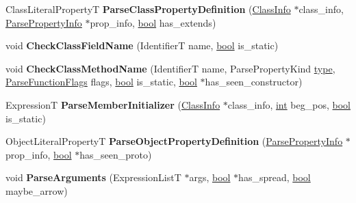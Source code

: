 \begin{DoxyCompactItemize}
\item 
\mbox{\label{classv8_1_1internal_1_1ParserBase_a5e44207ea2015814a7ef9e1edb6fb036}} 
Class\+Literal\+PropertyT {\bfseries Parse\+Class\+Property\+Definition} (\mbox{\hyperlink{structv8_1_1internal_1_1ParserBase_1_1ClassInfo}{Class\+Info}} $\ast$class\+\_\+info, \mbox{\hyperlink{structv8_1_1internal_1_1ParserBase_1_1ParsePropertyInfo}{Parse\+Property\+Info}} $\ast$prop\+\_\+info, \mbox{\hyperlink{classbool}{bool}} has\+\_\+extends)
\item 
\mbox{\label{classv8_1_1internal_1_1ParserBase_aac3022d3d8ac8def11e73bef6c20ce11}} 
void {\bfseries Check\+Class\+Field\+Name} (IdentifierT name, \mbox{\hyperlink{classbool}{bool}} is\+\_\+static)
\item 
\mbox{\label{classv8_1_1internal_1_1ParserBase_a49383d4a031fb45d52a315274fb2510d}} 
void {\bfseries Check\+Class\+Method\+Name} (IdentifierT name, Parse\+Property\+Kind \mbox{\hyperlink{classstd_1_1conditional_1_1type}{type}}, \mbox{\hyperlink{classv8_1_1base_1_1Flags}{Parse\+Function\+Flags}} flags, \mbox{\hyperlink{classbool}{bool}} is\+\_\+static, \mbox{\hyperlink{classbool}{bool}} $\ast$has\+\_\+seen\+\_\+constructor)
\item 
\mbox{\label{classv8_1_1internal_1_1ParserBase_af336fb6bfb4e9ef2c7c941d1c238ae1b}} 
ExpressionT {\bfseries Parse\+Member\+Initializer} (\mbox{\hyperlink{structv8_1_1internal_1_1ParserBase_1_1ClassInfo}{Class\+Info}} $\ast$class\+\_\+info, \mbox{\hyperlink{classint}{int}} beg\+\_\+pos, \mbox{\hyperlink{classbool}{bool}} is\+\_\+static)
\item 
\mbox{\label{classv8_1_1internal_1_1ParserBase_a4deeeae9572429fc183851accc42c1af}} 
Object\+Literal\+PropertyT {\bfseries Parse\+Object\+Property\+Definition} (\mbox{\hyperlink{structv8_1_1internal_1_1ParserBase_1_1ParsePropertyInfo}{Parse\+Property\+Info}} $\ast$prop\+\_\+info, \mbox{\hyperlink{classbool}{bool}} $\ast$has\+\_\+seen\+\_\+proto)
\item 
\mbox{\label{classv8_1_1internal_1_1ParserBase_ad66bb151435ac46c7e1bdb603b037753}} 
void {\bfseries Parse\+Arguments} (Expression\+ListT $\ast$args, \mbox{\hyperlink{classbool}{bool}} $\ast$has\+\_\+spread, \mbox{\hyperlink{classbool}{bool}} maybe\+\_\+arrow)

\end{DoxyCompactItemize}
